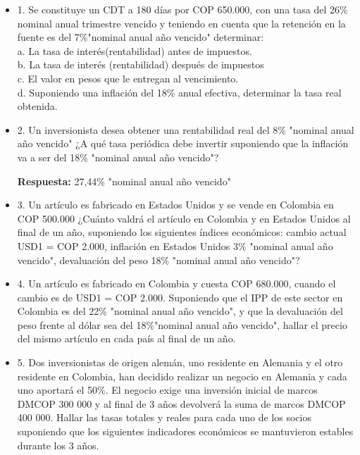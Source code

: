 \begin{itemize}

 \item 1. Se  constituye  un  CDT  a  180  días  por  COP 650.000,  con  una  tasa  del  26\% nominal anual trimestre vencido y teniendo  en  cuenta  que  la retención en la fuente es del 7\%"nominal anual año vencido" determinar:\\

       a. La tasa de interés(rentabilidad) antes de impuestos.\\
       b. La tasa de interés (rentabilidad) después de impuestos\\
       c. El valor en pesos que le entregan al vencimiento.\\
       d. Suponiendo una inflación del 18\% anual efectiva, determinar la tasa real obtenida.\\

       \medskip

 \item 2. Un inversionista desea  obtener  una  rentabilidad  real  del  8\%  "nominal anual año vencido" ¿A qué tasa periódica debe invertir suponiendo que la inflación va a ser del 18\% "nominal anual año vencido"?

       \textbf{Respuesta:} 27,44\% "nominal anual año vencido"\\
       \medskip

 \item 3. Un  artículo  es  fabricado  en  Estados  Unidos  y  se  vende  en  Colombia  en COP 500.000  ¿Cuánto  valdrá  el  artículo  en  Colombia  y  en  Estados  Unidos  al final  de  un  año,  suponiendo  los  siguientes  índices  económicos: cambio actual USD1 = COP 2.000, inflación en Estados Unidos 3\% "nominal anual año vencido", devaluación del peso 18\% "nominal anual año vencido"?\\
       \medskip

 \item 4. Un  artículo  es  fabricado en  Colombia  y  cuesta  COP 680.000,  cuando  el cambio es de USD1 = COP 2.000. Suponiendo que el IPP de este sector en Colombia es del 22\% "nominal anual año vencido", y que la devaluación del peso frente al dólar sea del 18\%"nominal anual año vencido", hallar el precio del mismo artículo en cada país al final de un año.\\
       \medskip

 \item 5. Dos  inversionistas  de  origen  alemán,  uno  residente  en  Alemania  y el  otro residente  en  Colombia,  han  decidido  realizar  un  negocio  en  Alemania  y cada uno aportará el 50\%. El negocio exige una inversión inicial de marcos  DMCOP 300 000   y   al   final   de   3   años   devolverá   la   suma   de   marcos DMCOP 400 000. Hallar las tasas totales y reales para cada uno de los socios suponiendo  que  los  siguientes  indicadores  económicos  se  mantuvieron estables durante los 3 años.\\


\end{itemize}
